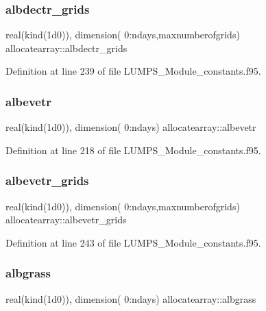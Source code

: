 \subsubsection{\texorpdfstring{albdectr\+\_\+grids}{albdectr\_grids}}
{\footnotesize\ttfamily real(kind(1d0)), dimension( 0\+:ndays,maxnumberofgrids) allocatearray\+::albdectr\+\_\+grids}



Definition at line 239 of file L\+U\+M\+P\+S\+\_\+\+Module\+\_\+constants.\+f95.

\mbox{\label{namespaceallocatearray_a55c401506715656db25c4f3ea8d44956}} 
\subsubsection{\texorpdfstring{albevetr}{albevetr}}
{\footnotesize\ttfamily real(kind(1d0)), dimension( 0\+:ndays) allocatearray\+::albevetr}



Definition at line 218 of file L\+U\+M\+P\+S\+\_\+\+Module\+\_\+constants.\+f95.

\mbox{\label{namespaceallocatearray_a052b2b45bd4ba25496922415f3af59b3}} 
\subsubsection{\texorpdfstring{albevetr\+\_\+grids}{albevetr\_grids}}
{\footnotesize\ttfamily real(kind(1d0)), dimension( 0\+:ndays,maxnumberofgrids) allocatearray\+::albevetr\+\_\+grids}



Definition at line 243 of file L\+U\+M\+P\+S\+\_\+\+Module\+\_\+constants.\+f95.

\mbox{\label{namespaceallocatearray_af087b466573effc0552f0a3b2d367db3}} 
\subsubsection{\texorpdfstring{albgrass}{albgrass}}
{\footnotesize\ttfamily real(kind(1d0)), dimension( 0\+:ndays) allocatearray\+::albgrass}



